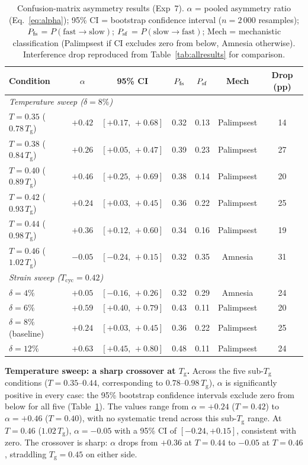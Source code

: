 \documentclass[12pt,a4paper]{article}
\newcommand{\Tg}{T_{\mathrm{g}}}
\newcommand{\Tbat}{T_{\mathrm{cyc}}}
\begin{document}
\begin{table}[htbp]
\centering
\caption{Confusion-matrix asymmetry results (Exp~7). $\alpha$ = pooled asymmetry ratio (Eq.~\ref{eq:alpha}); 95\% CI = bootstrap confidence interval ($n = 2\,000$ resamples); $P_{\rm fs}$ = $P(\text{fast}\to\text{slow})$; $P_{\rm sf}$ = $P(\text{slow}\to\text{fast})$; Mech = mechanistic classification (Palimpsest if CI excludes zero from below, Amnesia otherwise). Interference drop reproduced from Table~\ref{tab:allresults} for comparison.}
\label{tab:asymmetry}
\begin{tabular}{lcccccc}
\toprule
Condition & $\alpha$ & 95\% CI & $P_{\rm fs}$ & $P_{\rm sf}$ & Mech & Drop (pp) \\
\midrule
\multicolumn{7}{l}{\textit{Temperature sweep ($\delta = 8\%$)}} \\
$T = 0.35$ ($0.78\,\Tg$) & $+0.42$ & $[+0.17,\,+0.68]$ & 0.32 & 0.13 & Palimpsest & 14 \\
$T = 0.38$ ($0.84\,\Tg$) & $+0.26$ & $[+0.05,\,+0.47]$ & 0.39 & 0.23 & Palimpsest & 27 \\
$T = 0.40$ ($0.89\,\Tg$) & $+0.46$ & $[+0.25,\,+0.69]$ & 0.38 & 0.14 & Palimpsest & 20 \\
$T = 0.42$ ($0.93\,\Tg$) & $+0.24$ & $[+0.03,\,+0.45]$ & 0.36 & 0.22 & Palimpsest & 25 \\
$T = 0.44$ ($0.98\,\Tg$) & $+0.36$ & $[+0.12,\,+0.60]$ & 0.34 & 0.16 & Palimpsest & 19 \\
$T = 0.46$ ($1.02\,\Tg$) & $-0.05$ & $[-0.24,\,+0.15]$ & 0.32 & 0.35 & Amnesia    & 31 \\
\midrule
\multicolumn{7}{l}{\textit{Strain sweep ($\Tbat = 0.42$)}} \\
$\delta = 4\%$           & $+0.05$ & $[-0.16,\,+0.26]$ & 0.32 & 0.29 & Amnesia    & 24 \\
$\delta = 6\%$           & $+0.59$ & $[+0.40,\,+0.79]$ & 0.43 & 0.11 & Palimpsest & 20 \\
$\delta = 8\%$ (baseline)& $+0.24$ & $[+0.03,\,+0.45]$ & 0.36 & 0.22 & Palimpsest & 25 \\
$\delta = 12\%$          & $+0.63$ & $[+0.45,\,+0.80]$ & 0.48 & 0.11 & Palimpsest & 24 \\
\bottomrule
\end{tabular}
\end{table}
 
\textbf{Temperature sweep: a sharp crossover at $\Tg$.}
Across the five sub-$\Tg$ conditions ($T = 0.35$--$0.44$, corresponding to $0.78$--$0.98\,\Tg$), $\alpha$ is significantly positive in every case: the 95\% bootstrap confidence intervals exclude zero from below for all five (Table~\ref{tab:asymmetry}).
The values range from $\alpha = +0.24$ ($T = 0.42$) to $\alpha = +0.46$ ($T = 0.40$), with no systematic trend across this sub-$\Tg$ range.
At $T = 0.46$ ($1.02\,\Tg$), $\alpha = -0.05$ with a 95\% CI of $[-0.24, +0.15]$, consistent with zero.
The crossover is sharp: $\alpha$ drops from $+0.36$ at $T = 0.44$ to $-0.05$ at $T = 0.46$, straddling $\Tg = 0.45$ on either side.
 
\end{document}
